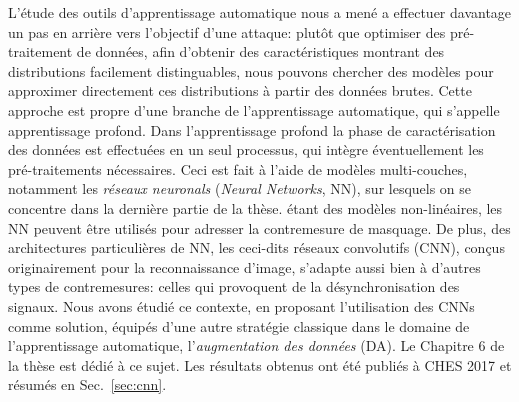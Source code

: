 L'\'{e}tude des outils d'apprentissage automatique nous a men\'{e} a effectuer davantage un pas en arri\`{e}re vers l'objectif d'une attaque: plut\^{o}t que optimiser des pr\'{e}-traitement de donn\'{e}es, afin d'obtenir des caract\'{e}ristiques montrant des distributions facilement distinguables, nous pouvons chercher des mod\`{e}les pour approximer directement ces distributions \`{a} partir des donn\'{e}es brutes. Cette approche est propre d'une branche de l'apprentissage automatique, qui s'appelle apprentissage profond. Dans l'apprentissage profond la phase de caract\'{e}risation des donn\'{e}es est effectu\'{e}es en un seul processus, qui int\`{e}gre \'{e}ventuellement les pr\'{e}-traitements n\'{e}cessaires. Ceci est fait \`{a} l'aide de mod\`{e}les multi-couches, notamment les \emph{r\'{e}seaux neuronals} (\emph{Neural Networks}, NN), sur lesquels on se concentre dans la derni\`{e}re partie de la th\`{e}se. \'{e}tant des mod\`{e}les non-lin\'{e}aires, les NN peuvent être utilis\'{e}s pour adresser la contremesure de masquage. De plus, des architectures particuli\`{e}res de NN, les ceci-dits r\'{e}seaux convolutifs (CNN), conçus originairement pour la reconnaissance d'image, s'adapte aussi bien \`{a} d'autres types de contremesures: celles qui provoquent de la d\'{e}synchronisation des signaux. Nous avons \'{e}tudi\'{e} ce contexte, en proposant l'utilisation des CNNs comme solution, \'{e}quip\'{e}s d'une autre strat\'{e}gie classique dans le domaine de l'apprentissage automatique, l'\emph{augmentation des donn\'{e}es} (DA). Le Chapitre 6 de la th\`ese est d\'edi\'e \`a ce sujet. Les r\'{e}sultats obtenus ont \'{e}t\'{e} publi\'{e}s \`{a} CHES 2017 \cite{DBLP:conf/ches/CagliDP17} et r\'{e}sum\'{e}s en Sec.~\ref{sec:cnn}.